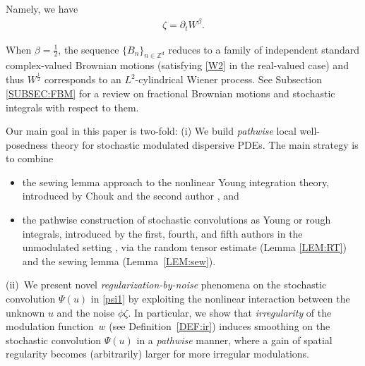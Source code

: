 \documentclass[letterpaper, 11pt,  reqno]{amsart}
\newcommand{\1}{\hspace{0.5mm}\textup{I}\hspace{0.5mm}}
\newcommand{\noi}{\noindent}
\newcommand{\Z}{\mathbb{Z}}
\newcommand{\be}{\beta}
\newcommand{\cj}{\overline}
\newcommand{\dt}{\partial_t}
\newcommand{\z}{\zeta}
\numberwithin{equation}{section}
\numberwithin{theorem}{section}
\begin{document}
\noi
Namely, we have
\begin{align}
\z = \dt W^\be.
\label{ze1}
\end{align}


\noi
When $\be = \frac 12$, 
the sequence $\{B_n \}_{n \in \Z^d}$ 
reduces to a family of independent 
standard
complex-valued 
 Brownian motions (satisfying \eqref{W2} in the real-valued case)
 and thus $W^{ \frac 12}$ corresponds 
 to an $L^2$-cylindrical Wiener process.
See Subsection \ref{SUBSEC:FBM}
for a review on fractional Brownian motions and 
stochastic integrals with respect to them.







Our main goal in this paper is two-fold:
(i)  
We build
{\it pathwise} local well-posedness theory for stochastic modulated
dispersive PDEs.
The main strategy is to combine

\smallskip
\begin{itemize}
\item
the sewing lemma approach to 
the nonlinear Young integration theory, 
introduced by Chouk and the second author \cite{CG1, CGLLO1}, and 

\smallskip
\item 
the pathwise construction of stochastic convolutions
as Young or rough integrals, 
introduced by the first, fourth, and fifth authors 
in the unmodulated setting
\cite{CLO2, CLO3, COZ, CLOO}, 
via 
the random tensor estimate
(Lemma \ref{LEM:RT})
and the sewing lemma
(Lemma~\ref{LEM:sew}).



\end{itemize}
\smallskip



\noi
(ii)~We
 present novel {\it regularization-by-noise} phenomena
on the stochastic convolution $\Psi (u)$ in \eqref{psi1}
by exploiting the nonlinear interaction between the unknown $u$ and the noise $\phi \zeta$.
In particular, 
we show that 
{\it irregularity} of the modulation function~$w$ (see Definition~\ref{DEF:ir}) induces
smoothing on the stochastic convolution $\Psi(u)$ 
in a {\it pathwise} manner, 
where 
a gain of spatial regularity  becomes (arbitrarily) larger for more irregular modulations.
\end{document}
